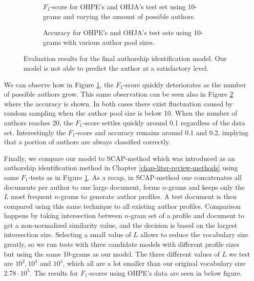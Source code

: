 \begin{figure}[!h] 
  \centering
  \begin{subfigure}[b]{\linewidth}
    \centering
    \setlength\figureheight{6cm}
    \setlength\figurewidth{\textwidth}
    
    \caption{$F_1$-score for OHPE's and OHJA's test set using 10-grams and varying the amount of possible authors.}
    \label{fig-ai-result-ohpeohja-testset:a}
    \vspace{4ex}
  \end{subfigure}
  \begin{subfigure}[b]{\linewidth}
    \centering
    \setlength\figureheight{6cm}
    \setlength\figurewidth{\textwidth}
    
    \caption{Accuracy for OHPE's and OHJA's test sets using 10-grams with various author pool sizes.}
  \label{fig-ai-result-ohpeohja-testset:b}
  \end{subfigure}
  \caption{Evaluation results for the final authorship identification model. Our model is not able to predict the author at a satisfactory level.}
  \label{fig-ai-result-ohpeohja-testset}
\end{figure}

We can observe how in Figure \ref{fig-ai-result-ohpeohja-testset:a}, the $F_1$-score quickly deteriorates as the number of possible authors grow. This same observation can be seen also in Figure \ref{fig-ai-result-ohpeohja-testset:b} where the accuracy is shown. In both cases there exist fluctuation caused by random sampling when the author pool size is below 10. When the number of authors reaches 20, the $F_1$-score settles quickly around 0.1 regardless of the data set. Interestingly the $F_1$-score and accuracy remains around 0.1 and 0.2, implying that a portion of authors are always classified correctly. 

Finally, we compare our model to SCAP-method which was introduced as an authorship identification method in Chapter \ref{chap-liter-review-methods} using same $F_1$-tests as in Figure \ref{fig-ai-result-ohpeohja-testset:a}. As a recap, in SCAP-method one concatenates all documents per author to one large document, forms $n$-grams and keeps only the $L$ most frequent $n$-grams to generate author profiles. A test document is then compared using this same technique to all existing author profiles. Comparison happens by taking intersection between $n$-gram set of a profile and document to get a non-normalized similarity value, and the decision is based on the largest intersection size. Selecting a small value of $L$ allows to reduce the vocabulary size greatly, so we run tests with three candidate models with different profile sizes but using the same 10-grams as our model. The three different values of $L$ we test are $10^2, 10^3$ and $10^4$, which all are a lot smaller than our original vocabulary size $2.78 \cdot 10^5$. The results for $F_1$-scores using OHPE's data are seen in below figure.

